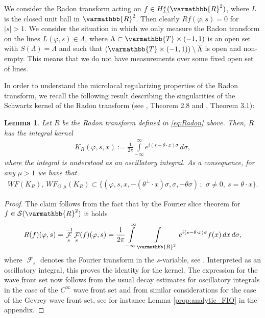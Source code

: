 \documentclass[12pt,twoside]{amsart}
\numberwithin{equation}{section}
\renewcommand{\mathbb}{\varmathbb}
\newtheorem{lemma}[theorem]{Lemma}
\newcommand {\R} {\mathbb{R}} \newcommand {\Z} {\mathbb{Z}}
\newcommand {\T} {\mathbb{T}} \newcommand {\N} {\mathbb{N}}
\DeclareMathOperator{\F} {\mathcal{F}}
\newcommand{\mR}{\mathbb{R}}                    %
\newcommand{\abs}[1]{\lvert #1 \rvert}          %
\newcommand{\ol}[1]{\overline{#1}}
\begin{document}
We consider the Radon transform acting on $f \in H^s_L(\mR^2)$, where $L$ is the closed unit ball in $\mR^2$. Then clearly $Rf(\varphi,s) = 0$ for $\abs{s} > 1$. We consider the situation in which we only measure the Radon transform on the lines $L(\varphi,s)\in \Lambda$, where $\Lambda \subset \T \times (-1,1)$ is an open set with $S(\Lambda) = \Lambda$ and such that $(\T \times (-1,1)) \setminus \ol{\Lambda}$ is open and non-empty. This means that we do not have measurements over some fixed open set of lines.


In order to understand the microlocal regularizing properties of the Radon transform, we recall the following result describing the singularities of the Schwartz kernel of the Radon transform (see \cite{Quinto1}, Theorem 2.8 and \cite{Quinto}, Theorem 3.1): 


\begin{lemma}
\label{lem:prop_singularities_Radon}
Let $R$ be the Radon transform defined in \eqref{eq:Radon} above. 
Then, $R$ has the integral kernel
\begin{align*}
K_R(\varphi,s,x):= \frac{1}{2 \pi} \int\limits_{-\infty}^{\infty} e^{i (s- \theta \cdot x) \sigma} \,d\sigma,
\end{align*}
where the integral is understood as an oscillatory integral.
As a consequence, for any $\mu>1$ we have that
\begin{align}
\label{eq:WFRadon} 
WF(K_R),\,WF_{G,\mu}(K_R) \subset \{(\varphi, s, x,-(\theta^{\perp}\cdot x) \sigma, \sigma, - \theta \sigma ) \,;\, \ \sigma\neq 0, \ s = \theta\cdot x\}.
\end{align}
\end{lemma}


\begin{proof}
The claim follows from the fact that by the Fourier slice theorem for $f\in \mathcal{S}(\R^2)$ it holds
\begin{align*}
R(f)(\varphi,s)= \F_s^{-1} \F_s(f)(\varphi,s)
= \frac{1}{2 \pi} \int\limits_{-\infty}^{\infty} \int\limits_{\R^2} e^{i(s-\theta \cdot x) \sigma} f(x) \,dx \,d\sigma,
\end{align*}
where $\F_s$ denotes the Fourier transform in the $s$-variable,
see \cite[equation (A.7)]{Quinto1}. Interpreted as an oscillatory integral, this proves the identity for the kernel. The expression for the wave front set now follows from the usual decay estimates for oscillatory integrals in the case of the $C^{\infty}$ wave front set and from similar considerations for the case of the Gevrey wave front set, see for instance Lemma \ref{prop:analytic_FIO} in the appendix. 
\end{proof}
\end{document}
